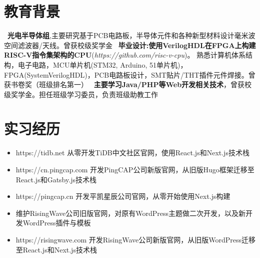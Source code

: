 \documentclass{resume}
\begin{document}
\section{ 教育背景}
        \ \textbf{光电半导体组},主要研究基于PCB电路板，半导体元件和各种新型材料设计毫米波空间滤波器/天线。曾获校级奖学金
        \ \textbf{毕业设计:使用VerilogHDL在FPGA上构建RISC-V指令集架构的CPU}(\textit{https://github.com/risc-v-cpu})。
    熟悉计算机体系结构，电子电路，MCU单片机(STM32, Arduino, 51单片机)，FPGA(SystemVerilogHDL)，PCB电路板设计，SMT贴片/THT插件元件焊接。曾获书卷奖（班级排名第一）
        \ \textbf{主要学习Java/PHP等Web开发相关技术}，曾获校级奖学金。担任班级学习委员，负责班级助教工作

\section{ 实习经历}
        \begin{itemize}
          \item https://tidb.net 从零开发TiDB中文社区官网，使用React.js和Next.js技术栈
          \item https://cn.pingcap.com 开发PingCAP公司新版官网，从旧版Hugo框架迁移至React.js和Gatsby.js技术栈
          \item https://pingcap.cn 开发平凯星辰公司官网，从零开始使用Next.js构建
        \end{itemize}

        \begin{itemize}
          \item 维护RisingWave公司旧版官网，对原有WordPress主题做二次开发，以及新开发WordPress插件与模板
          \item https://risingwave.com 开发RisingWave公司新版官网，从旧版WordPress迁移至React.js和Next.js技术栈
        \end{itemize}
\end{document}
